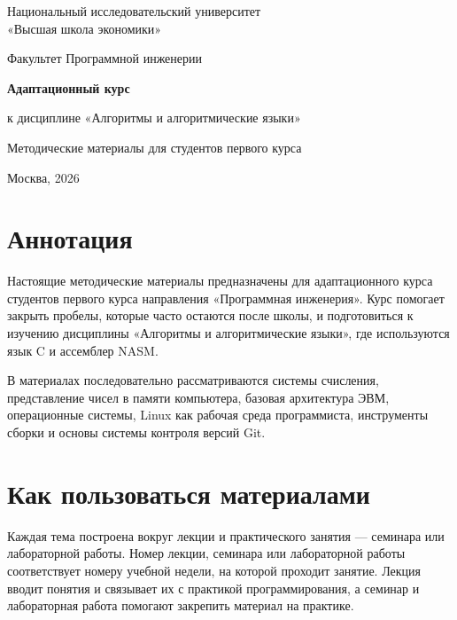 \hypersetup{pageanchor=false}

\begin{titlepage}
\thispagestyle{empty}
\begin{center}
Национальный исследовательский университет \\
«Высшая школа экономики»

\vspace{1cm}

Факультет Программной инженерии

\vfill

{\Large \textbf{Адаптационный курс}}

\vspace{0.5cm}

{\large к дисциплине «Алгоритмы и алгоритмические языки»}

\vspace{1cm}

{\large Методические материалы для студентов первого курса}

\vfill

Москва, 2026
\end{center}
\end{titlepage}

\clearpage
\hypersetup{pageanchor=true}

\chapter*{Аннотация}

Настоящие методические материалы предназначены для адаптационного курса студентов первого курса направления «Программная инженерия». Курс помогает закрыть пробелы, которые часто остаются после школы, и подготовиться к изучению дисциплины «Алгоритмы и алгоритмические языки», где используются язык C и ассемблер NASM.

В материалах последовательно рассматриваются системы счисления, представление чисел в памяти компьютера, базовая архитектура ЭВМ, операционные системы, Linux как рабочая среда программиста, инструменты сборки и основы системы контроля версий Git.

\chapter*{Как пользоваться материалами}

Каждая тема построена вокруг лекции и практического занятия --- семинара или лабораторной работы. Номер лекции, семинара или лабораторной работы соответствует номеру учебной недели, на которой проходит занятие. Лекция вводит понятия и связывает их с практикой программирования, а семинар и лабораторная работа помогают закрепить материал на практике.

